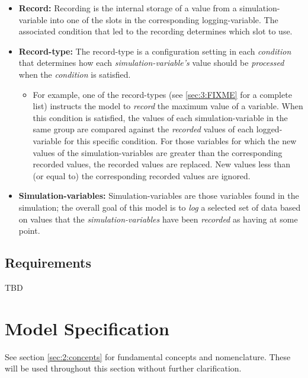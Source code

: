 \documentclass[11pt,fleqn]{report}
\begin{document}
\begin{itemize}
        consideration of the current value \textit{recorded} by the
        corresponding
        \textit{logging-variable} in the slot(s) reserved for the satisfied
        \textit{condition(s)}.
  \item \textbf{Record:} Recording is the internal storage of a value from
        a simulation-variable into one of the slots in the corresponding
        logging-variable. The associated condition that led to the
        recording determines which slot to use.
  \item \textbf{Record-type:} The record-type is a configuration setting in
        each \textit{condition} that determines how each
        \textit{simulation-variable's} value should be
        \textit{processed} when the \textit{condition} is satisfied.
  \begin{itemize}
    \item For example, one of the record-types (see \ref{sec:3:FIXME}
          for a complete list) instructs the model to \textit{record}
          the maximum
          value of a variable. When this condition is satisfied, the values
          of each simulation-variable in the same group are compared against
          the \textit{recorded} values of each logged-variable for this specific
          condition. For those variables for which the new values of the
          simulation-variables are
          greater than the corresponding recorded values, the recorded
          values are replaced. New values less than (or equal to) the
          corresponding recorded values are ignored.
  \end{itemize}
  \item \textbf{Simulation-variables:} Simulation-variables are those variables
        found in the simulation; the overall goal of this model is to
        \textit{log} a selected set of data based on values that the
        \textit{simulation-variables} have
        been \textit{recorded} as having at some point.
\end{itemize}

\section{Requirements}

TBD

\chapter {Model Specification}
See section \ref{sec:2:concepts} for fundamental concepts and nomenclature.
These will be used throughout this section without further clarification.
\end{document}
